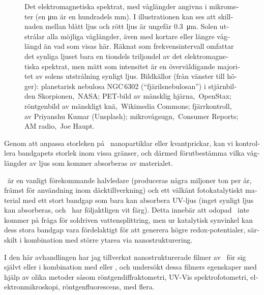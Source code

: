 \documentclass[draft,webedition,openright,titles,swedish,english]{LuaUUThesis}\usepackage[]{graphicx}\usepackage[]{xcolor}
\begin{document}
\begin{otherlanguage}{swedish}
\begin{figure}[tbp]
\begin{adjustbox}{max width=\textwidth}
\end{adjustbox}
\caption[Det elektromagnetiska spektrat]{%
   Det elektromagnetiska spektrat, med våglängder angivna i mikrometer
   (en \unit{\micro\metre} är en hundradels \unit{\mm}). I illustrationen kan ses
   att skillnaden mellan blått ljus och rött ljus är ungefär \qty{0.3}{\micro\metre}.
   Solen utstrålar alla möjliga våglängder, även med kortare eller längre våglängd än vad som visas här.
   Räknat som frekvensintervall omfattar det synliga ljuset bara
   en tiondels triljondel av det elektromagnetiska spektrat,
   men mätt som intensitet är en överväldigande majoritet av solens utstrålning synligt ljus.
   {\footnotesize Bildkällor (från vänster till höger):
   planetarisk nebulosa NGC\,6302 (\enquote{fjärilsnebulosan}) i stjärnbilden Skorpionen, \CCBY[\tiny]\,NASA;
   PET-bild av mänsklig hjärna, \CCBY[\tiny]\,OpenStax;
   röntgenbild av mänskligt knä, \CCBYSA[\tiny]\,Wikimedia Commons;
   fjärrkontroll, av Priyanshu Kumar (Unsplash);
   mikrovågsugn, \CCBY[\tiny]\,Consumer Reports;
   AM radio, \CCBY[\tiny]\,Joe Haupt.}
}
\label{fig:0900-elektromagnetiskt-spektrum}
\end{figure}

Genom att anpassa storleken på \ZnO\ nanopartiklar eller kvantprickar, kan vi
kontrollera bandgapets storlek inom vissa gränser,
och därmed förutbestämma vilka våglängder av ljus som kommer absorberas
av materialet.

\ZnO\ är en vanligt förekommande halvledare (produceras några miljoner ton per år,
främst för användning inom däcktillverkning) och ett välkänt fotokatalytiskt material
med ett stort bandgap som bara kan absorbera UV-ljus (inget synligt ljus kan absorberas,
och \ZnO\ har följaktligen vit färg).
Detta innebär att odopad \ZnO\ inte kommer på fråga för soldriven vattensplittring,
men ur katalytisk synvinkel kan dess stora bandgap vara fördelaktigt för att generera
högre redox-potentialer, särskilt i kombination med större ytarea via nanostrukturering.

I den här avhandlingen har jag tillverkat nanostrukturerade filmer av
\ZnO\ för sig självt eller i kombination med  eller \ironox,
och undersökt dessa filmers egenskaper med hjälp av olika
metoder såsom röntgendiffraktometri, \gls{UV-Vis} spektrofotometri,
elektronmikroskopi, röntgenfluorescens, med flera.


\end{otherlanguage}
\end{document}
